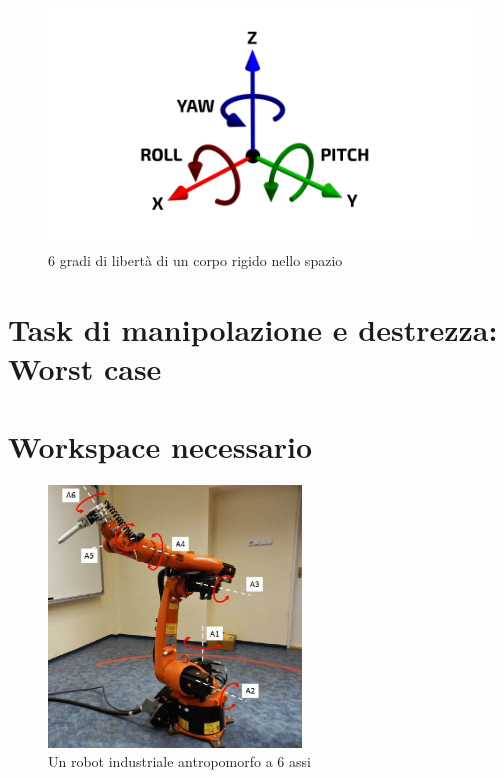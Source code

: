 \documentclass[%
corpo=11pt,
twoside,
 stile=classica,
oldstyle,
greek,%
]{toptesi}
\begin{document}
	 \begin{figure}
	 	\centering
	 	\includegraphics[width=\textwidth]{pictures/6DOF.png}
	 	\caption{6 gradi di libertà di un corpo rigido nello spazio}
	 	\label{fig:6DOF}
	 \end{figure}
	\section{Task di manipolazione e destrezza: Worst case}
\section{Workspace necessario}

\begin{figure}
	\centering
	\includegraphics[width=0.6\textwidth]{pictures/KUKA.png}
	\caption{Un robot industriale antropomorfo a 6 assi}
	\label{fig:KUKA}
\end{figure}
\end{document}
